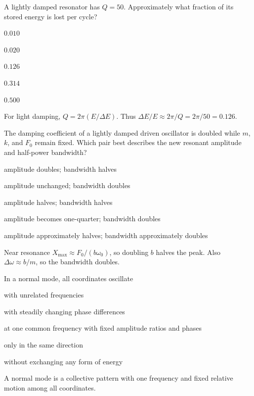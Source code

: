 \documentclass[10pt,a4paper,full]{physicsquiz}
\newcommand{\bankq}[9]{%
  \begin{quizquestion}[
    id=#1,
    topic={#2},
    difficulty=#3,
    marks=1,
    correct=#4,
    tags={#5},
    outcome={#6}
  ]
    #7
    \begin{choiceoptions}
      #8
    \end{choiceoptions}
  \end{quizquestion}
  \begin{quizsolution}
    #9
  \end{quizsolution}
}
\begin{document}
\begin{quizbank}
\bankq{coupled-034}{Coupled SHM, Q, and Power Response}{challenge}{C}{quality-factor,energy-loss}{Relate Q to fractional energy loss.}{%
A lightly damped resonator has \(Q=50\). Approximately what fraction of its stored energy is lost per cycle?}{%
\item \(0.010\)
\item \(0.020\)
\item \(0.126\)
\item \(0.314\)
\item \(0.500\)}{%
For light damping, \(Q=2\pi(E/\Delta E)\). Thus \(\Delta E/E\approx2\pi/Q=2\pi/50=0.126\).}

\bankq{coupled-035}{Coupled SHM, Q, and Power Response}{challenge}{E}{power,response-curve,scaling}{Analyze how damping changes a resonance curve.}{%
The damping coefficient of a lightly damped driven oscillator is doubled while \(m\), \(k\), and \(F_0\) remain fixed. Which pair best describes the new resonant amplitude and half-power bandwidth?}{%
\item amplitude doubles; bandwidth halves
\item amplitude unchanged; bandwidth doubles
\item amplitude halves; bandwidth halves
\item amplitude becomes one-quarter; bandwidth doubles
\item amplitude approximately halves; bandwidth approximately doubles}{%
Near resonance \(X_{\max}\approx F_0/(b\omega_0)\), so doubling \(b\) halves the peak. Also \(\Delta\omega\approx b/m\), so the bandwidth doubles.}


\bankq{modes-036}{Normal Modes}{foundation}{C}{normal-modes,definition}{Define a normal mode.}{%
In a normal mode, all coordinates oscillate}{%
\item with unrelated frequencies
\item with steadily changing phase differences
\item at one common frequency with fixed amplitude ratios and phases
\item only in the same direction
\item without exchanging any form of energy}{%
A normal mode is a collective pattern with one frequency and fixed relative motion among all coordinates.}


\end{quizbank}
\end{document}
